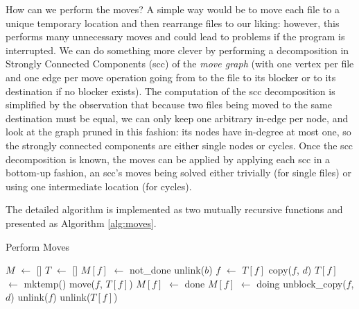 \documentclass[11pt]{llncs}
\newcommand*\Let[2]{\State #1 $\gets$ #2}
\begin{document}
How can we perform the moves? A simple way would be to move each file to a unique temporary location and then rearrange files to our liking: however, this performs many unnecessary moves and could lead to problems if the program is interrupted. We can do something more clever by performing a decomposition in Strongly Connected Components ({\sc scc}) of the {\sl move graph} (with one vertex per file and one edge per move operation going from to the file to its blocker or to its destination if no blocker exists). The computation of the {\sc scc} decomposition is simplified by the observation that because two files being moved to the same destination must be equal, we can only keep one arbitrary in-edge per node, and look at the graph pruned in this fashion: its nodes have in-degree at most one, so the strongly connected components are either single nodes or cycles. Once the {\sc scc} decomposition is known, the moves can be applied by applying each {\sc scc} in a bottom-up fashion, an {\sc scc}'s moves being solved either trivially (for single files) or using one intermediate location (for cycles).

The detailed algorithm is implemented as two mutually recursive functions and presented as Algorithm \ref{alg:moves}.

\begin{algorithm}
  \caption{Perform Moves}
  \label{alg:moves}
  \begin{algorithmic}[1]
    \Statex
    \Let{$M$}{[]}
    \Let{$T$}{[]}
      \Let{$M[f]$}{not\_done}
    \EndFor
          \State unlink($b$) 
        \Else
          \State {} 
        \EndIf
      \EndIf
        \Let{$f$}{$T[f]$}
      \EndIf
      \State copy($f$, $d$)
    \EndFunction
        \State \Return {}
      \EndIf
        \Let{$T[f]$}{mktemp()}
        \State move($f$, $T[f]$)
        \Let{$M[f]$}{done}
        \State \Return {}
      \EndIf
      \Let{$M[f]$}{doing}
          \State unblock\_copy($f$, $d$) 
        \EndIf
      \EndFor
        \State unlink($f$)
      \EndIf
        \State unlink($T[f]$)
      \EndIf
    \EndFunction

      \State {}
    \EndFor
  \end{algorithmic}
\end{algorithm}
\end{document}
